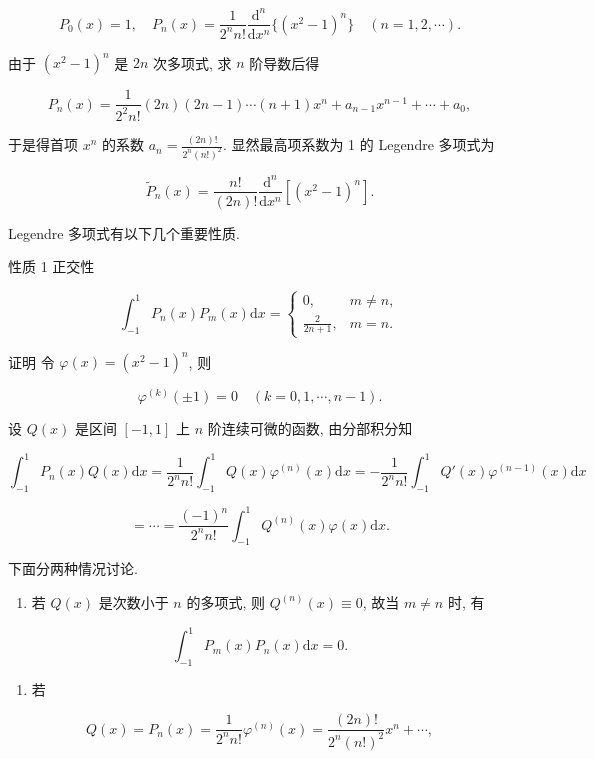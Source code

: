 \[
P_0(x) = 1, \quad P_n(x) = \frac{1}{2^n n!} \frac{\mathrm{d}^n}{\mathrm{d}x^n} \{(x^2 - 1)^n\} \quad (n = 1, 2, \cdots). \tag{3.4.1}
\]

由于 \((x^2 - 1)^n\) 是 \(2n\) 次多项式, 求 \(n\) 阶导数后得

\[
P_n(x) = \frac{1}{2^2 n!} (2n)(2n - 1) \cdots (n + 1)x^n + a_{n-1}x^{n-1} + \cdots + a_0,
\]

于是得首项 \(x^n\) 的系数 \(a_n = \frac{(2n)!}{2^n (n!)^2}\). 显然最高项系数为 1 的 Legendre 多项式为

\[
\tilde{P}_n(x) = \frac{n!}{(2n)!} \frac{\mathrm{d}^n}{\mathrm{d}x^n} [(x^2 - 1)^n]. \tag{3.4.2}
\]

Legendre 多项式有以下几个重要性质.

性质 1 正交性

\[
\int_{-1}^{1} P_n(x) P_m(x) \mathrm{d}x = \begin{cases} 0, & m \neq n, \\ \frac{2}{2n + 1}, & m = n. \end{cases} \tag{3.4.3}
\]

证明 令 \(\varphi(x) = (x^2 - 1)^n\), 则

\[
\varphi^{(k)}(\pm 1) = 0 \quad (k = 0, 1, \cdots, n - 1).
\]

设 \(Q(x)\) 是区间 \([-1, 1]\) 上 \(n\) 阶连续可微的函数, 由分部积分知

\[
\int_{-1}^{1} P_n(x) Q(x) \mathrm{d}x = \frac{1}{2^n n!} \int_{-1}^{1} Q(x) \varphi^{(n)}(x) \mathrm{d}x = -\frac{1}{2^n n!} \int_{-1}^{1} Q'(x) \varphi^{(n-1)}(x) \mathrm{d}x
\]

\[
= \cdots = \frac{(-1)^n}{2^n n!} \int_{-1}^{1} Q^{(n)}(x) \varphi(x) \mathrm{d}x.
\]

下面分两种情况讨论.

\begin{enumerate}
\def\labelenumi{(\arabic{enumi})}
\tightlist
\item
  若 \(Q(x)\) 是次数小于 \(n\) 的多项式, 则 \(Q^{(n)}(x) \equiv 0\), 故当 \(m \neq n\) 时, 有
\end{enumerate}

\[
\int_{-1}^{1} P_m(x) P_n(x) \mathrm{d}x = 0.
\]

\begin{enumerate}
\def\labelenumi{(\arabic{enumi})}
\setcounter{enumi}{1}
\tightlist
\item
  若
\end{enumerate}

\[
Q(x) = P_n(x) = \frac{1}{2^n n!} \varphi^{(n)}(x) = \frac{(2n)!}{2^n (n!)^2} x^n + \cdots,
\]

